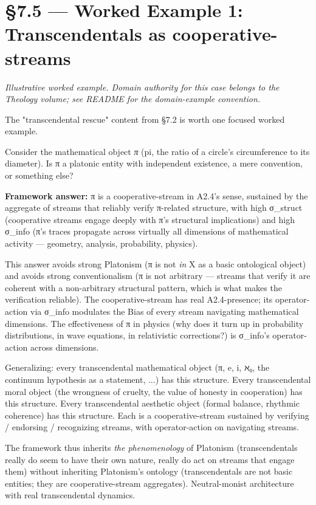 \documentclass[11pt, openany]{book}
\newcommand{\sectionbreak}{\clearpage}
\begin{document}
\sectionbreak

\section{§7.5 --- Worked Example 1: Transcendentals as cooperative-streams}

\textit{Illustrative worked example. Domain authority for this case belongs to the Theology volume; see README for the domain-example convention.}

The "transcendental rescue" content from §7.2 is worth one focused worked example.

Consider the mathematical object \textit{π} (pi, the ratio of a circle's circumference to its diameter). Is π a platonic entity with independent existence, a mere convention, or something else?

\textbf{Framework answer:} π is a cooperative-stream in A2.4's sense, sustained by the aggregate of streams that reliably verify π-related structure, with high σ\_\allowbreak{}struct (cooperative streams engage deeply with π's structural implications) and high σ\_\allowbreak{}info (π's traces propagate across virtually all dimensions of mathematical activity --- geometry, analysis, probability, physics).

This answer avoids strong Platonism (π is not \textit{in} X as a basic ontological object) and avoids strong conventionalism (π is not arbitrary --- streams that verify it are coherent with a non-arbitrary structural pattern, which is what makes the verification reliable). The cooperative-stream has real A2.4-presence; its operator-action via σ\_\allowbreak{}info modulates the Bias of every stream navigating mathematical dimensions. The effectiveness of π in physics (why does it turn up in probability distributions, in wave equations, in relativistic corrections?) is σ\_\allowbreak{}info's operator-action across dimensions.

Generalizing: every transcendental mathematical object (π, e, i, ℵ₀, the continuum hypothesis as a statement, ...) has this structure. Every transcendental moral object (the wrongness of cruelty, the value of honesty in cooperation) has this structure. Every transcendental aesthetic object (formal balance, rhythmic coherence) has this structure. Each is a cooperative-stream sustained by verifying / endorsing / recognizing streams, with operator-action on navigating streams.

The framework thus inherits \textit{the phenomenology} of Platonism (transcendentals really do seem to have their own nature, really do act on streams that engage them) without inheriting Platonism's ontology (transcendentals are not basic entities; they are cooperative-stream aggregates). Neutral-monist architecture with real transcendental dynamics.
\end{document}
